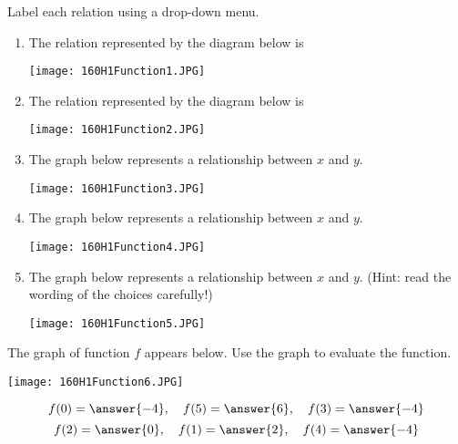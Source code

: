 \documentclass{ximera}
\begin{document}
\begin{problem}\label{prob:160hom1prob3}
Label each relation using a drop-down menu.
\begin{enumerate}
    \item The relation represented by the diagram below is 
    \begin{image}
   \texttt{[image: 160H1Function1.JPG]}
 \end{image}
 \item The relation represented by the diagram below is 
    \begin{image}
   \texttt{[image: 160H1Function2.JPG]}
 \end{image}
 \item The graph below represents a relationship between $x$ and $y$. 
    \begin{image}
   \texttt{[image: 160H1Function3.JPG]}
 \end{image}
 \item The graph below represents a relationship between $x$ and $y$. 
    \begin{image}
   \texttt{[image: 160H1Function4.JPG]}
 \end{image}
  \item The graph below represents a relationship between $x$ and $y$. 
  (Hint: read the wording of the choices carefully!)
    \begin{image}
   \texttt{[image: 160H1Function5.JPG]}
 \end{image}
\end{enumerate}
\end{problem}

\begin{problem}\label{prob:160hom1prob4}
The graph of function $f$ appears below.  Use the graph to evaluate the function.
\begin{image}
   \texttt{[image: 160H1Function6.JPG]}
 \end{image}
 $$f(0)=\answer{-4},\quad f(5)=\answer{6},\quad f(3)=\answer{-4}$$ $$f(2)=\answer{0},\quad f(1)=\answer{2},\quad f(4)=\answer{-4}$$
\end{problem}
\end{document}
